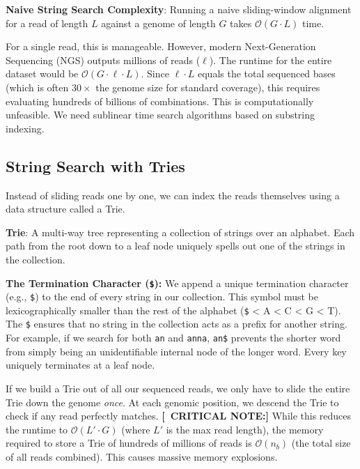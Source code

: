 \documentclass[11pt,a4paper]{article}
\newenvironment{important}{
    \vspace{1em}
    \begin{tcolorbox}[colback=blue!5!white, colframe=blue!75!black, boxrule=1pt, arc=4pt, left=10pt, right=10pt, top=10pt, bottom=10pt]
}{
    \end{tcolorbox}
    \vspace{1em}
}
\newcommand{\sta}{\textbf{[\textasteriskcentered\ CRITICAL NOTE:] }}
\begin{document}
\begin{important}
  \textbf{Naive String Search Complexity}:
  Running a naive sliding-window alignment for a read of length $L$ against a genome of length $G$ takes $\mathcal{O}(G \cdot L)$ time.
\end{important}

For a single read, this is manageable. However, modern Next-Generation Sequencing (NGS) outputs millions of reads ($\ell$). The runtime for the entire dataset would be $\mathcal{O}(G \cdot \ell \cdot L)$. Since $\ell \cdot L$ equals the total sequenced bases (which is often $30\times$ the genome size for standard coverage), this requires evaluating hundreds of billions of combinations. This is computationally unfeasible. We need sublinear time search algorithms based on substring indexing.

\subsection{String Search with Tries}

Instead of sliding reads one by one, we can index the reads themselves using a data structure called a Trie.

\begin{important}
  \textbf{Trie}: A multi-way tree representing a collection of strings over an alphabet. Each path from the root down to a leaf node uniquely spells out one of the strings in the collection.
\end{important}

\textbf{The Termination Character (\texttt{\$}):}
We append a unique termination character (e.g., \texttt{\$}) to the end of every string in our collection. This symbol must be lexicographically smaller than the rest of the alphabet (\texttt{\$} < A < C < G < T). 
The \texttt{\$} ensures that no string in the collection acts as a prefix for another string. For example, if we search for both \texttt{an} and \texttt{anna}, \texttt{an\$} prevents the shorter word from simply being an unidentifiable internal node of the longer word. Every key uniquely terminates at a leaf node.

If we build a Trie out of all our sequenced reads, we only have to slide the entire Trie down the genome \textit{once}. At each genomic position, we descend the Trie to check if any read perfectly matches.
\sta While this reduces the runtime to $\mathcal{O}(L' \cdot G)$ (where $L'$ is the max read length), the memory required to store a Trie of hundreds of millions of reads is $\mathcal{O}(n_b)$ (the total size of all reads combined). This causes massive memory explosions.
\end{document}
